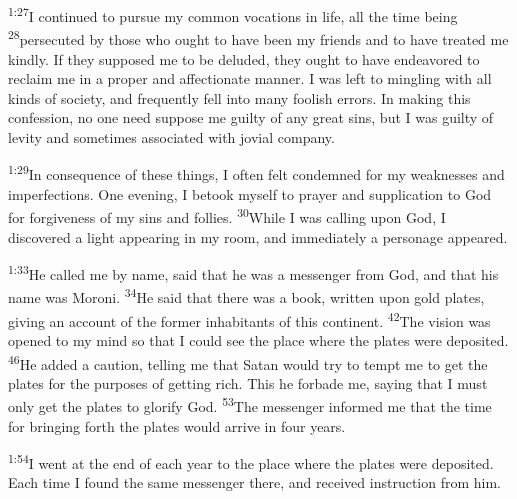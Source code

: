 \documentclass[openany,12pt,english]{book}
\newenvironment{para}{\par\pretolerance=100\tolerance=200\setlength{\emergencystretch}{0.6em}\relax}{\par}
\begin{document}
\bigskip{}

\begin{para}
    \textsuperscript{1:27}\thinspace{}I con\-tin\-ued to pur\-sue my com\-mon vocations in life, all the time be\-ing
    \textsuperscript{28}\thinspace{}per\-se\-cut\-ed by those who ought to have been my friends and to have treated me kind\-ly. If they sup\-posed me to be de\-lud\-ed, they ought to have endeavored to re\-claim me in a prop\-er and af\-fec\-tion\-ate man\-ner. I was left to mingling with all kinds of so\-ci\-e\-ty, and fre\-quent\-ly fell in\-to man\-y fool\-ish errors. In mak\-ing this con\-fes\-sion, no one need sup\-pose me guilt\-y of any great sins, but I was guilt\-y of lev\-i\-ty and some\-times as\-so\-ci\-at\-ed with jo\-vi\-al com\-pa\-ny.
\end{para}

\begin{para}
    \textsuperscript{1:29}\thinspace{}In con\-se\-quence of these things, I of\-ten felt condemned for my weaknesses and imperfections. One eve\-ning, I be\-took my\-self to pray\-er and sup\-pli\-ca\-tion to God for for\-give\-ness of my sins and follies.
    \textsuperscript{30}\thinspace{}While I was call\-ing up\-on God, I discovered a light appearing in my room, and im\-me\-di\-ate\-ly a per\-son\-age appeared.
\end{para}

\begin{para}
    \textsuperscript{1:33}\thinspace{}He called me by name, said that he was a mes\-sen\-ger from God, and that his name was Moroni.
    \textsuperscript{34}\thinspace{}He said that there was a book, writ\-ten up\-on gold plates, giv\-ing an ac\-count of the form\-er inhabitants of this con\-ti\-nent.
    \textsuperscript{42}\thinspace{}The vi\-sion was opened to my mind so that I could see the place where the plates were deposited.
    \textsuperscript{46}\thinspace{}He added a cau\-tion, tell\-ing me that Satan would try to tempt me to get the plates for the purposes of get\-ting rich. This he for\-bade me, say\-ing that I must on\-ly get the plates to glo\-ri\-fy God.
    \textsuperscript{53}\thinspace{}The mes\-sen\-ger in\-formed me that the time for bring\-ing forth the plates would ar\-rive in four years.
\end{para}

\bigskip{}

\begin{para}
    \textsuperscript{1:54}\thinspace{}I went at the end of each year to the place where the plates were deposited. Each time I found the same mes\-sen\-ger there, and re\-ceived in\-struc\-tion from him.
\end{para}
\end{document}
